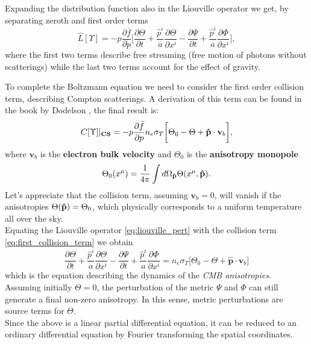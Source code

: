 Expanding the distribution function also in the Liouville operator we get, by separating zeroth and first order terms
\begin{equation}\label{eq:liouville_pert}
    \hat L[\Upsilon] = -p\frac{\partial\bar f}{\partial p}\bigg[\frac{\partial \Theta}{\partial t}+\frac{\hat p^i}{a}\frac{\partial \Theta}{\partial x^i}-\frac{\partial\Psi}{\partial t}+\frac{\hat p^i}{a}\frac{\partial \Phi}{\partial x^i}\bigg],
\end{equation}
where the first two terms describe free streaming (free motion of photons without scatterings) while the last two terms account for the effect of gravity. 

To complete the Boltzmann equation we need to consider the first order collision term, describing Compton scatterings. A derivation of this term can be found in the book by Dodelson \cite{dodelson}, the final result is:
\begin{equation} \label{eq:first_collision_term}
    C[\Upsilon]|_{\text{\textbf{CS}}} = -p\frac{\partial\bar f}{\partial p} n_{e}\sigma_T\bigg[\Theta_0-\Theta+\mathbf{\hat{p}}\cdot\mathbf{v}_{b}\bigg],
\end{equation}
where $\mathbf{v}_{b}$ is the \textbf{electron bulk velocity} and $\Theta_0$ is the \textbf{anisotropy monopole}
$$\Theta_0(x^\mu)=\frac{1}{4\pi}\int d\Omega_{\mathbf{\hat{p}}} \Theta(x^\mu,\mathbf{\hat{p}}).$$
Let's appreciate that the collision term, assuming $\mathbf{v}_b=0$, will vanish if the anisotropies $\Theta(\mathbf{\hat{p}})=\Theta_0$, which physically corresponds to a uniform temperature all over the sky.\\
Equating the Liouville operator \eqref{eq:liouville_pert} with the collision term \eqref{eq:first_collision_term} we obtain
\begin{equation}\label{eq:phot_boltzmann_pert}
    \frac{\partial \Theta}{\partial t}+\frac{\hat p^i}{a}\frac{\partial \Theta}{\partial x^i}-\frac{\partial\Psi}{\partial t}+\frac{\hat p^i}{a}\frac{\partial \Phi}{\partial x^i}=n_{e}\sigma_T\bigg[\Theta_0-\Theta+\mathbf{\hat{p}}\cdot\mathbf{v}_{b}\bigg]
\end{equation}
which is the equation describing the dynamics of the \emph{CMB anisotropies}. Assuming initially $\Theta=0$, the perturbation of the metric $\Psi$ and $\Phi$ can still generate a final non-zero anisotropy. In this sense, metric perturbations are source terms for $\Theta$.\\
Since the above is a linear partial differential equation, it can be reduced to an ordinary differential equation by Fourier transforming the spatial coordinates.
